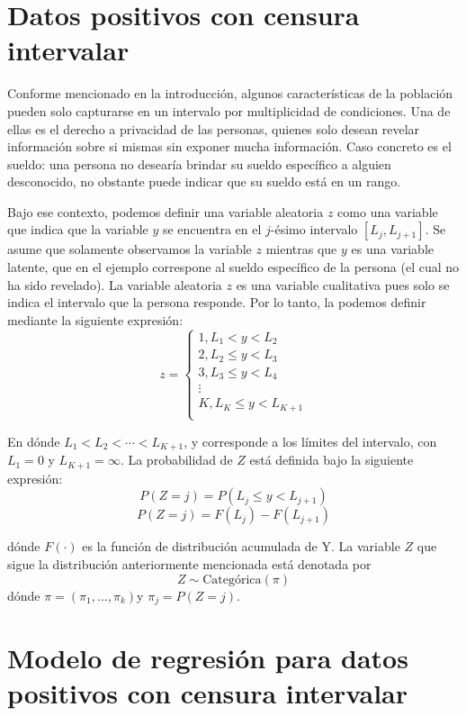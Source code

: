 \documentclass{report}
\begin{document}
\section{Datos positivos con censura intervalar}

Conforme mencionado en la introducción, algunos características de la población pueden solo capturarse en un intervalo por multiplicidad de condiciones. Una de ellas es el derecho a privacidad de las personas, quienes solo desean revelar información sobre si mismas sin exponer mucha información. Caso concreto es el sueldo: una persona no desearía brindar su sueldo específico a alguien desconocido, no obstante puede indicar que su sueldo está en un rango.

Bajo ese contexto, podemos definir una variable aleatoria $z$ como una variable que indica que la variable $y$ se encuentra en el $j$-ésimo intervalo $[L_{j},L_{j+1}]$. Se asume que solamente observamos la variable $z$ mientras que $y$ es una variable latente, que en el ejemplo correspone al sueldo específico de la persona (el cual no ha sido revelado). La variable aleatoria $z$ es una variable cualitativa pues solo se indica el intervalo que la persona responde. Por lo tanto, la podemos definir mediante la siguiente expresión:
\begin{equation}
z = 
	\begin{cases}
		1, L_{1}< y < L_{2} \\
		2, L_{2} \leq y < L_{3} \\
		3, L_{3} \leq y < L_{4} \\
		\vdots \\
		K, L_{K} \leq y < L_{K+1} \\
	\end{cases}
\end{equation}

En dónde $L_1 < L_2 < \cdots < L_{K+1}$, y corresponde a los límites del intervalo, con $L_{1}=0$ y $L_{K+1}=\infty$. La probabilidad de $Z$ está definida bajo la siguiente expresión:
\[P\left( Z=j \right)=P\left(L_{j} \leq y < L_{j+1} \right)\]
\[P\left( Z=j \right)=F\left( L_{j} \right)-F\left( L_{j+1} \right)\]

\noindent dónde $F(\cdot)$ es la función de distribución acumulada de Y. La variable $Z$ que sigue la distribución anteriormente mencionada está denotada por 
$$Z \sim \text{Categórica}(\pi)$$
\noindent dónde $\pi=\left( \pi_{1},\dots,\pi_{k}\right)$y $\pi_{j}=P(Z=j)$.

\section{Modelo de regresión para datos positivos con censura intervalar}
\end{document}
